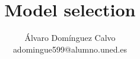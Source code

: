 \documentclass[12pt, a4paper]{article}
\title{Model selection}
\author{Álvaro Domínguez Calvo \\
adomingue599@alumno.uned.es}
\begin{document}
\date{}
\maketitle










\end{document}
